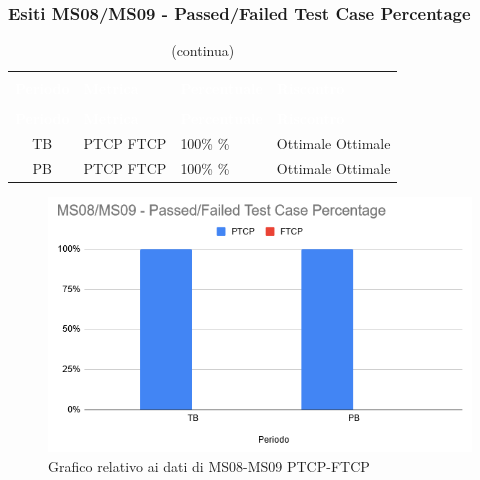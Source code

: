 \subsubsection{Esiti MS08/MS09 - Passed/Failed Test Case Percentage}
\begin{longtable}{c C{3cm} C{3cm} C{3cm}}
\caption{Esiti MS08/MS09 - PTCP-FTCP} \\
	\textcolor{white}{\textbf{Periodo}} &
\textcolor{white}{\textbf{Metrica}} &
\textcolor{white}{\textbf{Percentuale}} & 
\textcolor{white}{\textbf{Riscontro}} \\
	\endfirsthead
		\caption[]{(continua)} \\
		\textcolor{white}{\textbf{Periodo}} &
\textcolor{white}{\textbf{Metrica}} &
\textcolor{white}{\textbf{Percentuale}} & 
\textcolor{white}{\textbf{Riscontro}} \\
	\endhead
	TB & PTCP \newline FTCP & 100\% \% & Ottimale \newline Ottimale\\
	PB & PTCP \newline FTCP & 100\% \% & Ottimale \newline Ottimale\\
\end{longtable}

\begin{figure}[H]
\centering
\includegraphics[scale=0.7]{./img/MS08-MS09.png}
\caption{Grafico relativo ai dati di MS08-MS09 PTCP-FTCP}
\end{figure}

